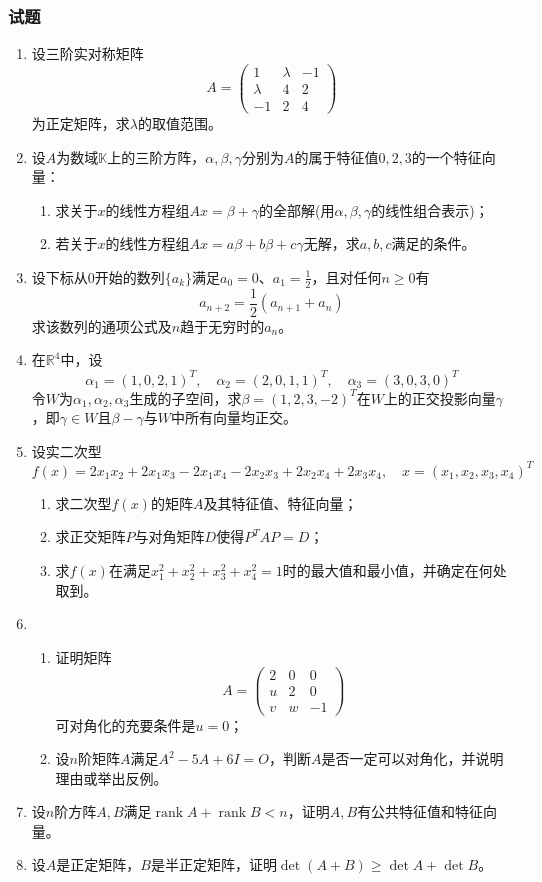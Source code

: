 \documentclass[a4paper,UTF8,fontset=windows,AutoFakeBold]{ctexart}
\DeclareMathOperator{\rank}{rank}
\begin{document}
\subsubsection{试题}
\begin{enumerate}
    \item 设三阶实对称矩阵
    $$A=\begin{pmatrix}1&\lambda&-1\\\lambda&4&2\\-1&2&4\end{pmatrix}$$
    为正定矩阵，求$\lambda$的取值范围。
    \item 设$A$为数域$\mathbb{K}$上的三阶方阵，$\alpha,\beta,\gamma$分别为$A$的属于特征值$0,2,3$的一个特征向量：
    \begin{enumerate}
        \item 求关于$x$的线性方程组$Ax=\beta+\gamma$的全部解(用$\alpha,\beta,\gamma$的线性组合表示)；
        \item 若关于$x$的线性方程组$Ax=a\beta+b\beta+c\gamma$无解，求$a,b,c$满足的条件。
    \end{enumerate}
    \item 设下标从0开始的数列$\{a_k\}$满足$a_0=0$、$a_1=\frac{1}{2}$，且对任何$n\ge0$有
    $$a_{n+2}=\frac{1}{2}(a_{n+1}+a_n)$$
    求该数列的通项公式及$n$趋于无穷时的$a_n$。
    \item 在$\mathbb{R}^4$中，设
    $$\alpha_1=(1,0,2,1)^T,\quad\alpha_2=(2,0,1,1)^T,\quad\alpha_3=(3,0,3,0)^T$$
    令$W$为$\alpha_1,\alpha_2,\alpha_3$生成的子空间，求$\beta=(1,2,3,-2)^T$在$W$上的正交投影向量$\gamma$，即$\gamma\in W$且$\beta-\gamma$与$W$中所有向量均正交。
    \item 设实二次型
    $$f(x)=2x_1x_2+2x_1x_3-2x_1x_4-2x_2x_3+2x_2x_4+2x_3x_4,\quad x=(x_1,x_2,x_3,x_4)^T$$
    \begin{enumerate}
        \item 求二次型$f(x)$的矩阵$A$及其特征值、特征向量；
        \item 求正交矩阵$P$与对角矩阵$D$使得$P^TAP=D$；
        \item 求$f(x)$在满足$x_1^2+x_2^2+x_3^2+x_4^2=1$时的最大值和最小值，并确定在何处取到。
    \end{enumerate}
    \item
    \begin{enumerate}
        \item 证明矩阵
        $$A=\begin{pmatrix}2&0&0\\u&2&0\\v&w&-1\end{pmatrix}$$
        可对角化的充要条件是$u=0$；
        \item 设$n$阶矩阵$A$满足$A^2-5A+6I=O$，判断$A$是否一定可以对角化，并说明理由或举出反例。
    \end{enumerate}
    \item 设$n$阶方阵$A,B$满足$\rank A+\rank B<n$，证明$A,B$有公共特征值和特征向量。
    \item 设$A$是正定矩阵，$B$是半正定矩阵，证明$\det(A+B)\ge\det A+\det B$。
\end{enumerate}
\end{document}
